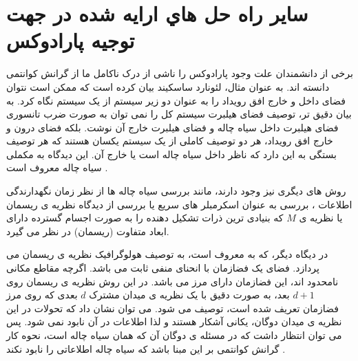 \section{سایر راه حل هاي ارایه شده در جهت توجیه پارادوکس}
برخی از دانشمندان علت  وجود پارادوکس را ناشی از درک ناکامل ما از گرانش کوانتمی دانسته اند. به عنوان مثال، لئونارد ساسکیند
بیان کرده است که ممکن است  نتوان فضای داخل و خارج افق رویداد را به عنوان دو زیر سیستم از یک سیستم نگاه کرد. به بیان دقیق تر، توصیف فضای هیلبرت سیستم کل را نمی توان به صورت ضرب تانسوری فضای هیلبرت داخل سیاه چاله و فضای هیلبرت خارج آن نوشت. بلکه فضای درون و خارج افق رویداد، هر دو توصیف کاملی از یک سیستم یکسان هستند که هر توصیف بستگی به این دارد که ناظر داخل سیاه چاله است یا خارج آن. این دیدگاه به مکملی سیاه چاله
 معروف است
\cite{SusComplementarity}. %



روش های دیگری نیز وجود دارند، مانند بررسی سیاه چاله ها از نظر زمان نگهدارندگی اطلاعات
\cite{mirror}
، بررسی به عنوان اسکرمبلر های سریع
\cite{SusScramb} %
یا بررسی از دیدگاه نظریه ی ریسمان یا نظریه ی 
$M$
که بنیادی ترین ذرات تشکیل دهنده را به صورت اجسام گسترده دارای ابعاد متفاوت (ریسمان) در نظر می گیرد.

در دیگاه دیگر، که به 
معروف است، به توصیف هولوگرافیک نظریه ی ریسمان می پردازد. فضای
یک فضازمان با انحنای منفی ثابت می باشد. اگرچه مقاطع مکانی نامحدود اند، این فضازمان دارای مرز می باشد. در این روش نظریه ی ریسمان روی 
$d+1$
بعد، به صورت دقیق با یک نظریه ی میدان مشترک
$d$
بعدی که روی مرز فضازمان تعریف شده است، توصیف می شود.  می توان نشان داد که تحولات در این نظریه ی میدان دوگان، یکانی آشکار هستند و لذا اطلاعات در آن نابود نمی شود. پس می توان انتظار داشت که در مسئله ی دوگان آن که همان سیاه چاله است،  نحوه کار گرانش کوانتمی بر این مبنا باشد که سیاه چاله اطلاعاتی را نابود نکند
\cite{AdS}. %